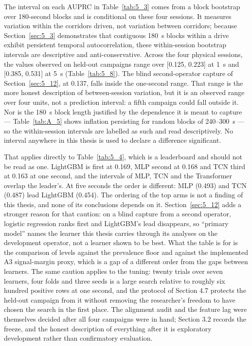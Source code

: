 The interval on each AUPRC in Table~\ref{tab:5_3} comes from a block bootstrap over 180-second blocks and is conditional on these four sessions. It measures variation within the corridors driven, not variation between corridors; because Section~\ref{sec:5_3} demonstrates that contiguous 180~s blocks within a drive exhibit persistent temporal autocorrelation, these within-session bootstrap intervals are descriptive and anti-conservative. Across the four physical sessions, the values observed on held-out campaigns range over [0.125, 0.223] at 1~s and [0.385, 0.531] at 5~s (Table~\ref{tab:5_8}). The blind second-operator capture of Section~\ref{sec:5_12}, at 0.137, falls inside the one-second range. That range is the more honest description of between-session variation, but it is an observed range over four units, not a prediction interval: a fifth campaign could fall outside it. Nor is the 180~s block length justified by the dependence it is meant to capture --- Table~\ref{tab:A_5} shows inflation persisting for random blocks of 240--300~s --- so the within-session intervals are labelled as such and read descriptively. No interval anywhere in this thesis is used to declare a difference significant.

That applies directly to Table~\ref{tab:5_4}, which is a leaderboard and should not be read as one. LightGBM is first at 0.169, MLP second at 0.168 and TCN third at 0.163 at one second, and the intervals of MLP, TCN and the Transformer overlap the leader's. At five seconds the order is different: MLP (0.493) and TCN (0.487) lead LightGBM (0.454). The ordering of the top arms is not a finding of this thesis, and none of its conclusions depends on it. Section~\ref{sec:5_12} adds a stronger reason for that caution: on a blind capture from a second operator, logistic regression ranks first and LightGBM's lead disappears, so ``primary model'' names the learner this thesis carries through its analyses on the development operator, not a learner shown to be best. What the table is for is the comparison of levels against the prevalence floor and against the implemented A3 signal-margin proxy, which is a gap of a different order from the gaps between learners. The same caution applies to the tuning: twenty trials over seven learners, four folds and three seeds is a large search relative to roughly six hundred positive rows at one second, and the protocol of Section 4.7 protects the held-out campaign from it without removing the researcher's freedom to have chosen the search in the first place. The alignment audit and the feature lag were themselves decided after all four campaigns were in hand; Section 3.2 records the freeze, and the honest description of everything after it is exploratory development rather than confirmatory evaluation.


